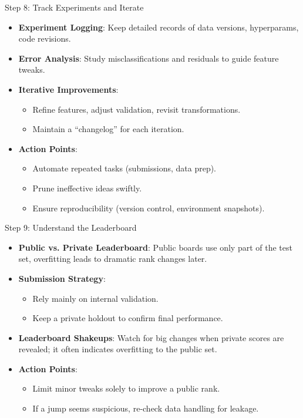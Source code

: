 \documentclass[10pt,compress,t,notes=noshow, xcolor=table]{beamer}
\begin{document}
\begin{frame}{Step 8: Track Experiments and Iterate}
\begin{itemize}
  \item \textbf{Experiment Logging}: Keep detailed records of data versions, hyperparams, code revisions.
  \item \textbf{Error Analysis}: Study misclassifications and residuals to guide feature tweaks.
  \item \textbf{Iterative Improvements}:
    \begin{itemize}
      \item Refine features, adjust validation, revisit transformations.
      \item Maintain a “changelog” for each iteration.
    \end{itemize}
  \item \textbf{Action Points}:
    \begin{itemize}
      \item Automate repeated tasks (submissions, data prep).
      \item Prune ineffective ideas swiftly.
      \item Ensure reproducibility (version control, environment snapshots).
    \end{itemize}
\end{itemize}
\end{frame}

\begin{frame}{Step 9: Understand the Leaderboard}
\begin{itemize}
  \item \textbf{Public vs. Private Leaderboard}: Public boards use only part of the test set, overfitting leads to dramatic rank changes later.
  \item \textbf{Submission Strategy}:
    \begin{itemize}
      \item Rely mainly on internal validation.
      \item Keep a private holdout to confirm final performance.
    \end{itemize}
  \item \textbf{Leaderboard Shakeups}: Watch for big changes when private scores are revealed; it often indicates overfitting to the public set.
  \item \textbf{Action Points}:
    \begin{itemize}
      \item Limit minor tweaks solely to improve a public rank.
      \item If a jump seems suspicious, re-check data handling for leakage.
    \end{itemize}
\end{itemize}
\end{frame}
\end{document}

